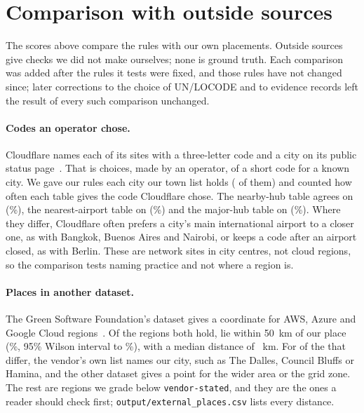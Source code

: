 \documentclass[10pt,twocolumn]{article}
\newcommand{\code}[1]{\texttt{#1}}
\begin{document}
\section{Comparison with outside sources}
\label{sec:external}

The scores above compare the rules with our own placements. Outside sources give checks we did not make ourselves; none is ground truth. Each comparison was added after the rules it tests were fixed, and those rules have not changed since; later corrections to the choice of UN/LOCODE and to evidence records left the result of every such comparison unchanged.

\paragraph{Codes an operator chose.} Cloudflare names each of its sites with a three-letter code and a city on its public status page~\citep{cloudflare_status}. That is \operatorSites{} choices, made by an operator, of a short code for a known city. We gave our rules each city our town list holds (\operatorSitesResolved{} of them) and counted how often each table gives the code Cloudflare chose. The nearby-hub table agrees on \operatorNearbyHub{} (\operatorNearbyHubShare{}\%), the nearest-airport table on \operatorNearest{} (\operatorNearestShare{}\%) and the major-hub table on \operatorMajorHub{} (\operatorMajorHubShare{}\%). Where they differ, Cloudflare often prefers a city's main international airport to a closer one, as with Bangkok, Buenos Aires and Nairobi, or keeps a code after an airport closed, as with Berlin. These are network sites in city centres, not cloud regions, so the comparison tests naming practice and not where a region is.

\paragraph{Places in another dataset.} The Green Software Foundation's dataset gives a coordinate for AWS, Azure and Google Cloud regions~\citep{gsf_real_time_cloud}. Of the \outsidePlacesCompared{} regions both hold, \outsidePlacesNear{} lie within 50~km of our place (\outsidePlacesShare{}\%, 95\% Wilson interval \outsidePlacesLow{} to \outsidePlacesHigh{}\%), with a median distance of \outsidePlacesMedianKm{}~km. For \outsidePlacesFarStated{} of the \outsidePlacesFar{} that differ, the vendor's own list names our city, such as The Dalles, Council Bluffs or Hamina, and the other dataset gives a point for the wider area or the grid zone. The rest are regions we grade below \code{vendor-stated}, and they are the ones a reader should check first; \code{output/external\_places.csv} lists every distance.
\end{document}
